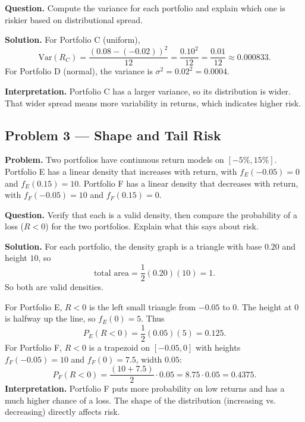 \begin{ExamProblems}
		\textbf{Question.} Compute the variance for each portfolio and explain which one is riskier
		based on distributional spread.
		
		\textbf{Solution.}
		For Portfolio C (uniform),
		\[
		\mathrm{Var}(R_C)=\frac{(0.08-(-0.02))^2}{12}=\frac{0.10^2}{12}=\frac{0.01}{12}\approx 0.000833.
		\]
		For Portfolio D (normal), the variance is \(\sigma^2=0.02^2=0.0004\).
		
		\textbf{Interpretation.} Portfolio C has a larger variance, so its distribution is wider.
		That wider spread means more variability in returns, which indicates higher risk.
		
		
		\hypertarget{c9-ex3}{}
		\item
		\subsection*{Problem 3 — Shape and Tail Risk}
		
		\textbf{Problem.}
		Two portfolios have continuous return models on \([-5\%,15\%]\).
		Portfolio E has a linear density that increases with return, with
		\(f_E(-0.05)=0\) and \(f_E(0.15)=10\).
		Portfolio F has a linear density that decreases with return, with
		\(f_F(-0.05)=10\) and \(f_F(0.15)=0\).
		
		\textbf{Question.} Verify that each is a valid density, then compare the probability of a loss
		(\(R<0\)) for the two portfolios. Explain what this says about risk.
		
		\textbf{Solution.}
		For each portfolio, the density graph is a triangle with base \(0.20\) and height \(10\), so
		\[
		\text{total area}=\frac{1}{2}(0.20)(10)=1.
		\]
		So both are valid densities.
		
		For Portfolio E, \(R<0\) is the left small triangle from \(-0.05\) to 0.
		The height at 0 is halfway up the line, so \(f_E(0)=5\).
		Thus
		\[
		P_E(R<0)=\frac{1}{2}(0.05)(5)=0.125.
		\]
		For Portfolio F, \(R<0\) is a trapezoid on \([-0.05,0]\) with heights
		\(f_F(-0.05)=10\) and \(f_F(0)=7.5\), width \(0.05\):
		\[
		P_F(R<0)=\frac{(10+7.5)}{2}\cdot 0.05=8.75\cdot 0.05=0.4375.
		\]
		\textbf{Interpretation.} Portfolio F puts more probability on low returns and has a much higher chance
		of a loss. The shape of the distribution (increasing vs. decreasing) directly affects risk.
		
	\end{ExamProblems}
	
